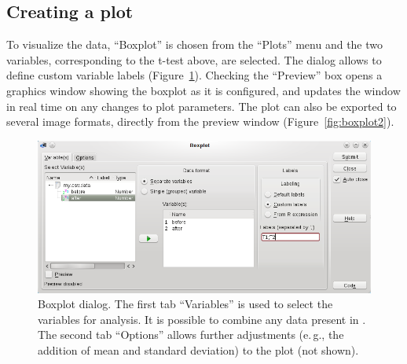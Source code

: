 \subsection{Creating a plot}
\label{sec:create_plot}
To visualize the data, ``Boxplot'' is chosen from the ``Plots'' menu
and the two variables, corresponding to the t-test above, are selected.
The dialog allows to define custom variable labels (Figure~\ref{fig:boxplot1}).
Checking the ``Preview'' box opens a graphics window showing the boxplot as
it is configured, and updates the window in real time on any changes to plot parameters.
The plot can also be exported to several image formats, directly from the preview window (Figure~\ref{fig:boxplot2}).

\begin{figure}[t!]
 \centering
 \includegraphics[width=15.4cm]{./figures/boxplot1.png}
 \caption{Boxplot dialog. The first tab ``Variables'' is used to select the variables for analysis. It is possible to
  combine any data present in . The second tab ``Options'' allows further adjustments (e.\,g., the addition of mean and standard deviation) to the plot (not shown).}
 \label{fig:boxplot1}
\end{figure}

